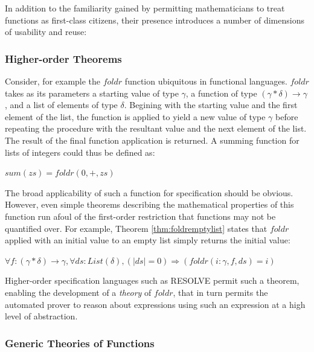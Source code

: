 In addition to the familiarity gained by permitting mathematicians to treat functions as first-class citizens, their presence introduces a number of dimensions of usability and reuse:

		\subsubsection{Higher-order Theorems\label{higherOrderTheorems}}

Consider, for example the $foldr$ function ubiquitous in functional languages.  $foldr$ takes as its parameters a starting value of type $\gamma$, a function of type $(\gamma*\delta)\rightarrow\gamma$, and a list of elements of type $\delta$.  Begining with the starting value and the first element of the list, the function is applied to yield a new value of type $\gamma$ before repeating the procedure with the resultant value and the next element of the list.  The result of the final function application is returned.  A summing function for lists of integers could thus be defined as:

$sum(zs) = foldr(0, +, zs)$

The broad applicability of such a function for specification should be obvious.  However, even simple theorems describing the mathematical properties of this function run afoul of the first-order restriction that functions may not be quantified over.  For example, Theorem \ref{thm:foldremptylist} states that $foldr$ applied with an initial value to an empty list simply returns the initial value:

\begin{thm}
$\forall f : (\gamma*\delta)\rightarrow\gamma, \forall ds : List(\delta), (|ds| = 0) \Rightarrow (foldr(i : \gamma, f, ds) = i)$
\label{thm:foldremptylist}
\end{thm}

Higher-order specification languages such as RESOLVE permit such a theorem, enabling the development of a \emph{theory} of $foldr$, that in turn permits the automated prover to reason about expressions using such an expression at a high level of abstraction.

		\subsubsection{Generic Theories of Functions\label{genericTheoriesFunctions}}

